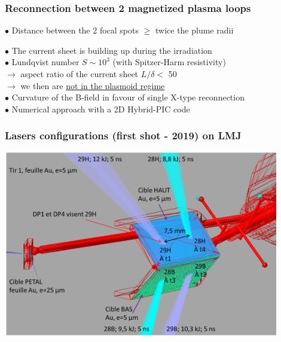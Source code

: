 \documentclass{beamer}
\begin{document}
\begin{frame}
\frametitle{Reconnection between 2 magnetized plasma loops}

$\bullet$ Distance between the 2 focal spots $\geq$ twice the plume radii

\begin{center}

\end{center}

$\bullet$ The current sheet is building up during the irradiation \\
$\bullet$ Lundqvist number $S \sim 10^3$ (with Spitzer-Harm resistivity) \\
$\to$ aspect ratio of the current sheet $L/\delta < $ 50 \\
$\to$ we then are \underline{not in the plasmoid regime} \\
$\bullet$ Curvature of the B-field in favour of single X-type reconnection \\
$\bullet$ Numerical approach with a 2D Hybrid-PIC code \\

\end{frame}



\begin{frame}
\frametitle{Lasers configurations (first shot - 2019) on LMJ}

\begin{center}
\includegraphics[width=0.9\textwidth]{tir1.png}
\end{center}

\end{frame}
\end{document}
